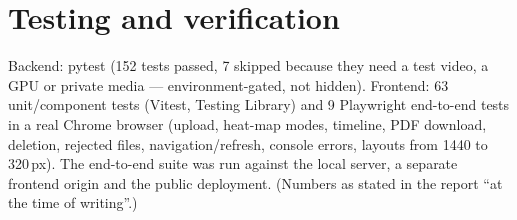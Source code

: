 \documentclass[11pt,a4paper]{report}
\begin{document}
\section{Testing and verification}
Backend: pytest (152 tests passed, 7 skipped because they need a test video, a GPU or private media --- environment-gated, not hidden). Frontend: 63 unit/component tests (Vitest, Testing Library) and 9 Playwright end-to-end tests in a real Chrome browser (upload, heat-map modes, timeline, PDF download, deletion, rejected files, navigation/refresh, console errors, layouts from 1440 to 320\,px). The end-to-end suite was run against the local server, a separate frontend origin and the public deployment. (Numbers as stated in the report ``at the time of writing''.)

\end{document}

